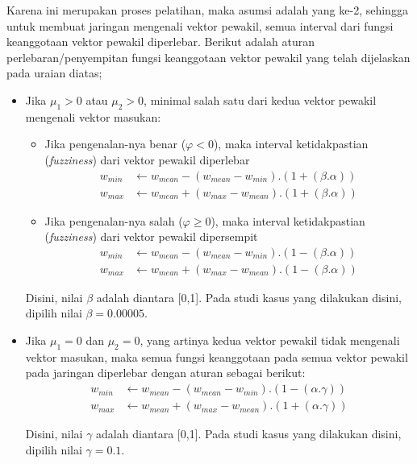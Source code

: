 \noindent Karena ini merupakan proses pelatihan, maka asumsi adalah
yang ke-2, sehingga untuk membuat jaringan mengenali vektor pewakil, semua
interval dari fungsi keanggotaan vektor pewakil diperlebar. Berikut adalah
aturan perlebaran/penyempitan fungsi keanggotaan vektor pewakil yang telah
dijelaskan pada uraian diatas;
\begin{itemize}
  \setlength{\itemsep}{1pt}
  \setlength{\parskip}{0pt}
  \setlength{\parsep}{0pt}
  \item Jika  $\mu_1 > 0$ atau $\mu_2 > 0$, minimal salah satu dari kedua
  vektor pewakil mengenali vektor masukan:
  \begin{itemize}
  \setlength{\itemsep}{1pt}
  \setlength{\parskip}{0pt}
  \setlength{\parsep}{0pt}
    \item Jika pengenalan-nya benar ($\varphi < 0$), maka interval
    ketidakpastian (\emph{fuzziness}) dari vektor pewakil diperlebar
    	\begin{align}
    	\label{eq:increasefuzzy}
    	w_{min} &\leftarrow w_{mean} - (w_{mean} - w_{min}) . (1 + (\beta .
    	\alpha)) \nonumber \\
    	w_{max} &\leftarrow w_{mean} + (w_{max} - w_{mean}) . (1 + (\beta .
    	\alpha)) 
    	\end{align}
    \item Jika pengenalan-nya salah ($\varphi \geq 0$), maka interval
    ketidakpastian (\emph{fuzziness}) dari vektor pewakil dipersempit
    	\begin{align}
    	\label{eq:decreasefuzzy}
    	w_{min} &\leftarrow w_{mean} - (w_{mean} - w_{min}) . (1 - (\beta .
    	\alpha)) \nonumber \\
    	w_{max} &\leftarrow w_{mean} + (w_{max} - w_{mean}) . (1 - (\beta .
    	\alpha)) 
    	\end{align}
  \end{itemize}
  
  Disini, nilai $\beta$ adalah diantara [0,1]. Pada studi kasus yang dilakukan
  disini, dipilih nilai $\beta = 0.00005$.
  
  \item Jika  $\mu_1=0$ dan $\mu_2=0$, yang artinya kedua vektor pewakil
  tidak mengenali vektor masukan, maka semua fungsi keanggotaan pada semua
  vektor pewakil pada jaringan diperlebar dengan aturan sebagai berikut:
  	\begin{align}
  	\label{eq:increaseall}
	w_{min} &\leftarrow w_{mean} - (w_{mean} - w_{min}) . (1 - (\alpha .
	\gamma)) \nonumber \\ 
	w_{max} &\leftarrow w_{mean} + (w_{max} - w_{mean})
	. (1 + (\alpha . \gamma)) 
	\end{align}
	
	Disini, nilai $\gamma$ adalah diantara [0,1]. Pada studi kasus yang dilakukan
	disini, dipilih nilai $\gamma = 0.1$.
\end{itemize}
  
